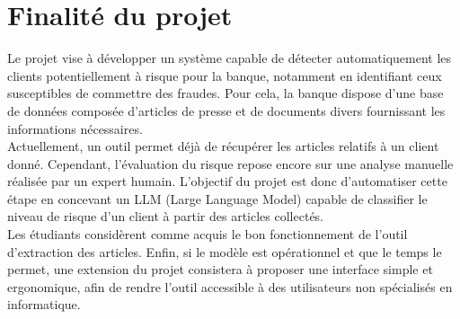 \section{Finalité du projet}

Le projet vise à développer un système capable de détecter automatiquement les clients potentiellement à risque pour la banque, notamment en identifiant ceux susceptibles de commettre des fraudes. Pour cela, la banque dispose d’une base de données composée d’articles de presse et de documents divers fournissant les informations nécessaires. \\

Actuellement, un outil permet déjà de récupérer les articles relatifs à un client donné. Cependant, l’évaluation du risque repose encore sur une analyse manuelle réalisée par un expert humain. L’objectif du projet est donc d’automatiser cette étape en concevant un LLM (Large Language Model) capable de classifier le niveau de risque d’un client à partir des articles collectés. \\

Les étudiants considèrent comme acquis le bon fonctionnement de l’outil d’extraction des articles. Enfin, si le modèle est opérationnel et que le temps le permet, une extension du projet consistera à proposer une interface simple et ergonomique, afin de rendre l’outil accessible à des utilisateurs non spécialisés en informatique.
